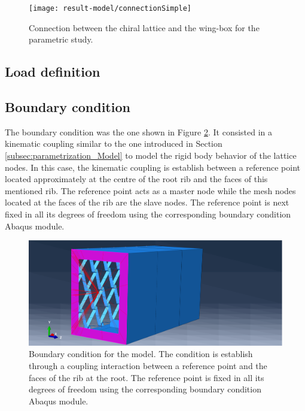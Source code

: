     \begin{figure}[!htpb]
      \centering
      \texttt{[image: result-model/connectionSimple]}
      \caption[Connection between the chiral lattice and the wing-box for the parametric study]{Connection between the chiral lattice and the wing-box for the parametric study.}\label{fig:connectionSimple}
    \end{figure}

  \subsection{Load definition} \label{subsec:load_results_model}

  \subsection{Boundary condition} \label{subsec:boundary_results_model}

    The boundary condition was the one shown in Figure \ref{fig:fixed}. It consisted in a kinematic coupling similar to the one introduced in Section \ref{subsec:parametrization_Model} to model the rigid body behavior of the lattice nodes. In this case, the kinematic coupling is establish between a reference point located approximately at the centre of the root rib and the faces of this mentioned rib. The reference point acts as a master node while the mesh nodes located at the faces of the rib are the slave nodes. The reference point is next fixed in all its degrees of freedom using the corresponding boundary condition Abaqus module.

    \begin{figure}[!htpb]
      \centering
      \includegraphics[width=0.8 \textwidth]{../figures/result-model/fixed}
      \caption[Boundary condition for the model]{Boundary condition for the model. The condition is establish through a coupling interaction between a reference point and the faces of the rib at the root. The reference point is fixed in all its degrees of freedom using the corresponding boundary condition Abaqus module.}\label{fig:fixed}
    \end{figure}

